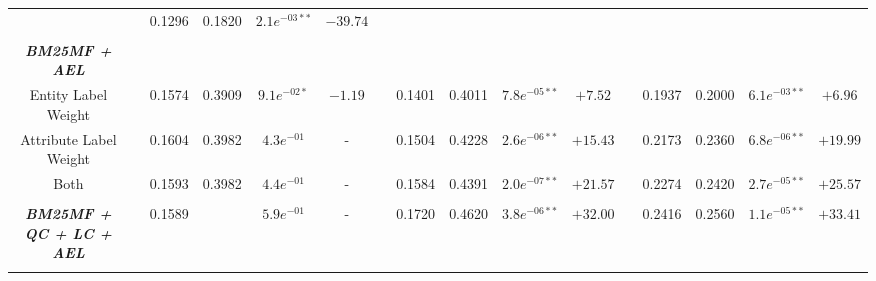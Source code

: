 \begin{table*}
{\begin{tabular}{cc@{\hs}rrccc@{\hs}rrccc@{\hs}rrcc}
                                                   & \phantom{a} & 0.1296 & 0.1820 & $2.1e^{-03**}$ & $-39.74$ \\
\\
\emph{\textbf{BM25MF + AEL}} & \multicolumn{15}{c}{\phantom{a}} \\
{\raggedright Entity Label Weight} & \phantom{a} & 0.1574 & 0.3909 & $9.1e^{-02*}$ & $-1.19$
                                   & \phantom{a} & 0.1401 & 0.4011 & $7.8e^{-05**}$ & $+7.52$
                                   & \phantom{a} & 0.1937 & 0.2000 & $6.1e^{-03**}$ & $+6.96$ \\
{\raggedright Attribute Label Weight} & \phantom{a} & 0.1604 & 0.3982 & $4.3e^{-01}$ & -
                                      & \phantom{a} & 0.1504 & 0.4228 & $2.6e^{-06**}$ & $+15.43$
                                      & \phantom{a} & 0.2173 & 0.2360 & $6.8e^{-06**}$ & $+19.99$ \\
{\raggedright Both} & \phantom{a} & 0.1593 & 0.3982 & $4.4e^{-01}$ & -
                    & \phantom{a} & 0.1584 & 0.4391 & $2.0e^{-07**}$ & $+21.57$
                    & \phantom{a} & 0.2274 & 0.2420 & $2.7e^{-05**}$ & $+25.57$ \\
\\
\emph{\textbf{BM25MF + QC + LC + AEL}} & \phantom{a} & 0.1589 &  & $5.9e^{-01}$ & -
                                       & \phantom{a} & 0.1720 & 0.4620 & $3.8e^{-06**}$ & $+32.00$
                                       & \phantom{a} & 0.2416 & 0.2560 & $1.1e^{-05**}$ & $+33.41$ \\
\midrule
\\[-0.2cm]


\end{tabular}}
\end{table*}
